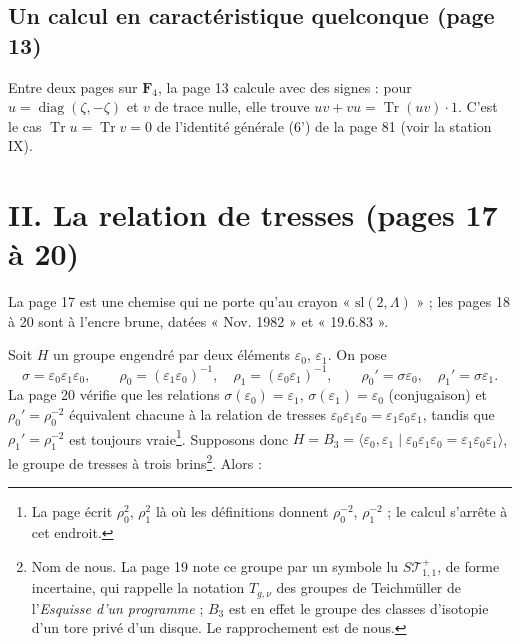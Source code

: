 \documentclass[11pt,a4paper]{article}
\begin{document}
\subsection*{Un calcul en caractéristique quelconque (page 13)}

Entre deux pages sur $\mathbf{F}_4$, la page 13 calcule avec des signes : pour
$u = \operatorname{diag}(\zeta, -\zeta)$ et $v$ de trace nulle, elle trouve
$uv + vu = \operatorname{Tr}(uv)\cdot 1$. C'est le cas $\operatorname{Tr}u =
\operatorname{Tr}v = 0$ de l'identité générale (6') de la page 81 (voir la
station IX).

\section*{II. La relation de tresses (pages 17 à 20)}

La page 17 est une chemise qui ne porte qu'au crayon « $\mathrm{sl}(2,
\Lambda)$ » ; les pages 18 à 20 sont à l'encre brune, datées « Nov. 1982 » et
« 19.6.83 ».

Soit $H$ un groupe engendré par deux éléments $\varepsilon_0$, $\varepsilon_1$.
On pose
\[
  \sigma = \varepsilon_0\varepsilon_1\varepsilon_0,\qquad
  \rho_0 = (\varepsilon_1\varepsilon_0)^{-1},\quad
  \rho_1 = (\varepsilon_0\varepsilon_1)^{-1},\qquad
  \rho_0' = \sigma\varepsilon_0,\quad \rho_1' = \sigma\varepsilon_1 .
\]
La page 20 vérifie que les relations $\sigma(\varepsilon_0) = \varepsilon_1$,
$\sigma(\varepsilon_1) = \varepsilon_0$ (conjugaison) et $\rho_0' =
\rho_0^{-2}$ équivalent chacune à la relation de tresses
$\varepsilon_0\varepsilon_1\varepsilon_0 = \varepsilon_1\varepsilon_0\varepsilon_1$,
tandis que $\rho_1' = \rho_1^{-2}$ est toujours vraie\footnote{La page écrit
$\rho_0^2$, $\rho_1^2$ là où les définitions donnent $\rho_0^{-2}$,
$\rho_1^{-2}$ ; le calcul s'arrête à cet endroit.}. Supposons donc
$H = B_3 = \langle \varepsilon_0, \varepsilon_1 \mid
\varepsilon_0\varepsilon_1\varepsilon_0 = \varepsilon_1\varepsilon_0\varepsilon_1
\rangle$, le groupe de tresses à trois brins\footnote{Nom de nous. La page 19
note ce groupe par un symbole lu $S\mathcal{T}^{+}_{1,1}$, de forme incertaine,
qui rappelle la notation $T_{g,\nu}$ des groupes de Teichmüller de
l'\emph{Esquisse d'un programme} ; $B_3$ est en effet le groupe des classes
d'isotopie d'un tore privé d'un disque. Le rapprochement est de nous.}. Alors :
\end{document}

